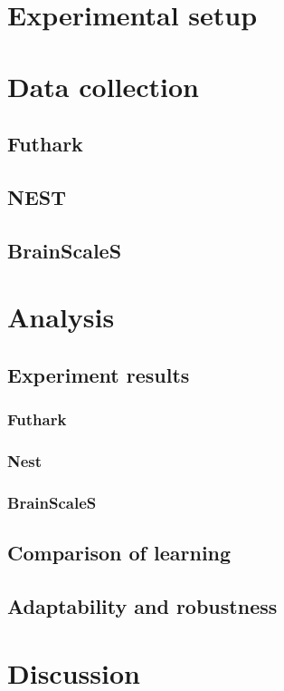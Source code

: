 \documentclass[a4paper,oneside]{memoir}
\begin{document}
\chapter{Experimental setup} \label{sec:experiment}
  

\chapter{Data collection}
  \section{Futhark}
  \section{NEST}
  \section{BrainScaleS}

\chapter{Analysis}
  \section{Experiment results}
  \subsection{Futhark}
  \subsection{Nest}
  \subsection{BrainScaleS}
  \section{Comparison of learning}
  \section{Adaptability and robustness} %

\chapter{Discussion} \label{sec:discussion}
\end{document}
